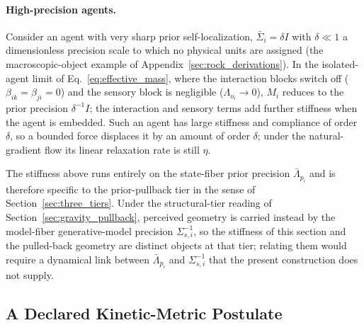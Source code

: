 \documentclass[11pt]{article}
\begin{document}
\paragraph{High-precision agents.} Consider an agent with very sharp prior self-localization, $\bar{\Sigma}_i = \delta I$ with $\delta \ll 1$ a dimensionless precision scale to which no physical units are assigned (the macroscopic-object example of Appendix~\ref{sec:rock_derivations}). In the isolated-agent limit of Eq.~\eqref{eq:effective_mass}, where the interaction blocks switch off ($\beta_{ik} = \beta_{ji} = 0$) and the sensory block is negligible ($\Lambda_{o_i} \to 0$), $M_i$ reduces to the prior precision $\delta^{-1}I$; the interaction and sensory terms add further stiffness when the agent is embedded. Such an agent has large stiffness and compliance of order $\delta$, so a bounded force displaces it by an amount of order $\delta$; under the natural-gradient flow its linear relaxation rate is still $\eta$.

The stiffness above runs entirely on the state-fiber prior precision $\bar{\Lambda}_{p_i}$ and is therefore specific to the prior-pullback tier in the sense of Section~\ref{sec:three_tiers}. Under the structural-tier reading of Section~\ref{sec:gravity_pullback}, perceived geometry is carried instead by the model-fiber generative-model precision $\Sigma_{s,i}^{-1}$, so the stiffness of this section and the pulled-back geometry are distinct objects at that tier; relating them would require a dynamical link between $\bar{\Lambda}_{p_i}$ and $\Sigma_{s,i}^{-1}$ that the present construction does not supply.

\subsection{A Declared Kinetic-Metric Postulate}
\label{sec:velocity_quadratic}
\end{document}
